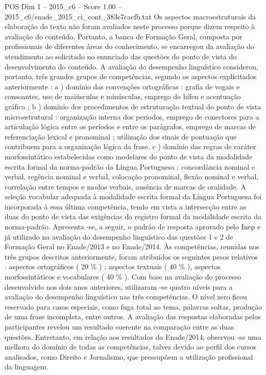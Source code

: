 \begin{textsample}{POS Dim 1 – 2015\_c6 – Score 1.00 – 2015\_c6/enade\_2015\_ci\_cont\_383e7cacfb.txt}
Os aspectos macroestruturais da elaboração do texto não foram avaliados neste processo porque dizem respeito à avaliação do conteúdo.
Portanto, a banca de Formação Geral, composta por profissionais de diferentes áreas do conhecimento, se encarregou da avaliação do atendimento ao solicitado no enunciado das questões do ponto de vista do desenvolvimento do conteúdo.
A avaliação do desempenho linguístico considerou, portanto, três grandes grupos de competências, segundo os aspectos explicitados anteriormente : a ) domínio das convenções ortográficas : grafia de vogais e consoantes, uso de maiúsculas e minúsculas, emprego do hífen e acentuação gráfica ; b ) domínio dos procedimentos de estruturação textual do ponto de vista microestrutural : organização interna dos períodos, emprego de conectores para a articulação lógica entre os períodos e entre os parágrafos, emprego de marcas de referenciação lexical e pronominal ; utilização dos sinais de pontuação que contribuem para a organização lógica da frase. c ) domínio das regras de caráter morfossintático estabelecidas como modelares do ponto de vista da modalidade escrita formal da norma-padrão da Língua Portuguesa : concordância nominal e verbal, regência nominal e verbal, colocação pronominal, flexão nominal e verbal, correlação entre tempos e modos verbais, ausência de marcas de oralidade.
A seleção vocabular adequada à modalidade escrita formal da Língua Portuguesa foi incorporada à essa última competência, tendo em vista a intersecção entre as duas do ponto de vista das exigências do registro formal da modalidade escrita da norma-padrão.
Apresenta -se, a seguir, o padrão de resposta aprovado pelo Inep e já utilizado na avaliação do desempenho linguístico das questões 1 e 2 de Formação Geral no Enade/2013 e no Enade/2014.
Às competências, reunidas nos três grupos descritos anteriormente, foram atribuídos os seguintes pesos relativos : aspectos ortográficos ( 20 \% ) ; aspectos textuais ( 40 \% ), aspectos morfossintáticos e vocabulares ( 40 \% ).
Com base na avaliação do processo desenvolvido nos dois anos anteriores, utilizaram -se quatro níveis para a avaliação do desempenho linguístico nas três competências.
O nível zero ficou reservado para casos especiais, como fuga total ao tema, palavras soltas, produção de uma frase incompleta, entre outros.
A avaliação das respostas elaboradas pelos participantes revelou um resultado coerente na comparação entre as duas questões.
Entretanto, em relação aos resultados do Enade/2014, observou -se uma melhora do domínio de todas as competências, talvez devido ao perfil dos cursos analisados, como Direito e Jornalismo, que pressupõem a utilização profissional da linguagem.

\end{textsample}
